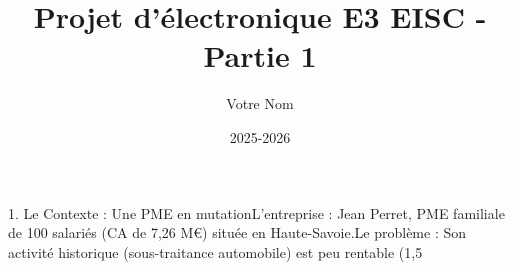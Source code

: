 \documentclass[a4paper]{article}
\title{Projet d'électronique E3 EISC - Partie 1}
\author{Votre Nom}
\date{2025-2026}
\begin{document}
\maketitle


1. Le Contexte : Une PME en mutationL'entreprise : Jean Perret, PME familiale de 100 salariés (CA de 7,26 M€) située en Haute-Savoie.Le problème : Son activité historique (sous-traitance automobile) est peu rentable (1,5%



\end{document}

